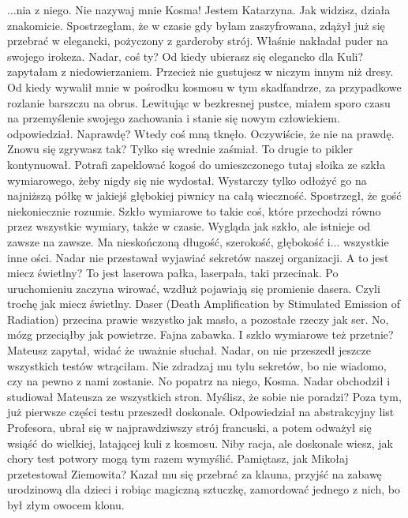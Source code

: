 \begin{dialogue}
...nia z niego. \dm{} Nie nazywaj mnie Kosma! Jestem Katarzyna.
\ds{} Jak widzisz, działa znakomicie. \dm{} Spostrzegłam, że w czasie gdy byłam zaszyfrowana, zdążył już się przebrać w elegancki, pożyczony z garderoby strój. 
Właśnie nakładał puder na swojego irokeza.
\ds{} Nadar, coś ty? Od kiedy ubierasz się elegancko dla Kuli? \dm{} zapytałam z niedowierzaniem. \dm{} Przecież nie gustujesz w niczym innym niż dresy.
\ds{} Od kiedy wywalił mnie w pośrodku kosmosu w tym skadfandrze, za przypadkowe rozlanie barszczu na obrus. 
Lewitując w bezkresnej pustce, miałem sporo czasu na przemyślenie swojego zachowania i stanie się nowym człowiekiem. \dm{} odpowiedział.
\ds{} Naprawdę? \dm{} Wtedy coś mną tknęło. \dm{} Oczywiście, że nie na prawdę. Znowu się zgrywasz tak? \dm{} Tylko się wrednie zaśmiał.
\ds{} To drugie to pikler \dm{} kontynuował. \dm{} Potrafi zapeklować kogoś do umieszczonego tutaj słoika ze szkła wymiarowego, żeby nigdy się nie wydostał.
Wystarczy tylko odłożyć go na najniższą półkę w jakiejś głębokiej piwnicy na całą wieczność.
\dm{} Spostrzegł, że gość niekoniecznie rozumie. \dm{}
Szkło wymiarowe to takie coś, które przechodzi równo przez wszystkie wymiary, także w czasie. 
Wygląda jak szkło, ale istnieje od zawsze na zawsze. 
Ma nieskończoną długość, szerokość, głębokość i... wszystkie inne ości. \dm{}
Nadar nie przestawał wyjawiać sekretów naszej organizacji.
\ds{} A to jest miecz świetlny?
\ds{} To jest laserowa pałka, laserpała, taki przecinak.
Po uruchomieniu zaczyna wirować, wzdłuż pojawiają się promienie dasera. Czyli trochę jak miecz świetlny.
Daser (Death Amplification by Stimulated Emission of Radiation) przecina prawie wszystko jak masło, a pozostałe rzeczy jak ser. 
No, mózg przeciąłby jak powietrze.
Fajna zabawka.
\ds{} I szkło wymiarowe też przetnie? \ds{} Mateusz zapytał, widać że uważnie słuchał.
\ds{} Nadar, on nie przeszedł jeszcze wszystkich testów \dm{} wtrąciłam. \dm{} Nie zdradzaj mu tylu sekretów, bo nie wiadomo, czy na pewno z nami zostanie.
\ds{} No popatrz na niego, Kosma. \dm{} Nadar obchodził i studiował Mateusza ze wszystkich stron. \dm{} Myślisz, że sobie nie poradzi?
Poza tym, już pierwsze części testu przeszedł doskonale. 
Odpowiedział na abstrakcyjny list Profesora, ubrał się w najprawdziwszy strój francuski, a potem odważył się wsiąść do wielkiej, latającej kuli z kosmosu.
\ds{} Niby racja, ale doskonale wiesz, jak chory test potwory mogą tym razem wymyślić.
Pamiętasz, jak Mikołaj przetestował Ziemowita? Kazał mu się przebrać za klauna, przyjść na zabawę urodzinową dla dzieci i robiąc magiczną sztuczkę, zamordować jednego z nich, bo był złym owocem klonu.

\end{dialogue}
